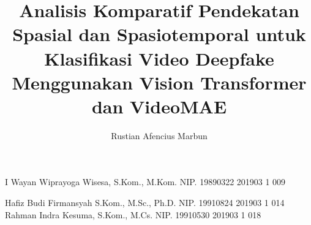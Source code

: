 \documentclass[article]{report} %
\begin{document}
    
    \title{Analisis Komparatif Pendekatan Spasial dan Spasiotemporal untuk Klasifikasi Video Deepfake Menggunakan Vision Transformer dan VideoMAE}
    
	\author{Rustian Afencius Marbun}		%
	
	\dosbingA%
		{I Wayan Wiprayoga Wisesa, S.Kom., M.Kom.}%
		{NIP. 19890322 201903 1 009}	%
		
	\pengujiA%
		{Hafiz Budi Firmansyah S.Kom., M.Sc., Ph.D.}%
		{NIP. 19910824 201903 1 014}	%
	\pengujiB%
		{Rahman Indra Kesuma, S.Kom., M.Cs.}%
		{NIP. 19910530 201903 1 018}	%

	\sloppy %
    \setcounter{page}{1} %
\end{document}
